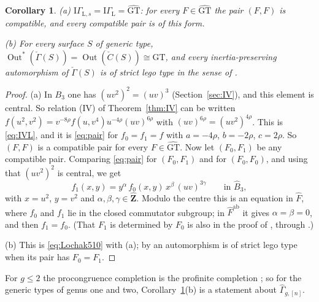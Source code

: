 \documentclass[11pt,a4paper]{article}
\theoremstyle{plain}
\newtheorem{corollary}[theorem]{Corollary}
\theoremstyle{definition}
\theoremstyle{remark}
\newcommand{\GT}{\widehat{\mathrm{GT}}}
\newcommand{\Zh}{\widehat{\mathbf Z}}
\newcommand{\Fh}{\widehat F}
\newcommand{\Bh}{\widehat B}
\newcommand{\Gh}{\widehat\Gamma}
\newcommand{\Out}{\operatorname{Out}}
\newcommand{\ab}{\mathrm{ab}}
\begin{document}
\begin{corollary}\label{cor:Lochak}
\textup{(a)} $\mathrm{I}\Gamma_{\mathrm L,s}=\mathrm{I}\Gamma_{\mathrm L}=\GT$: for every $F\in\GT$ the pair $(F,F)$
is compatible, and every compatible pair is of this form.

\textup{(b)} For every surface $S$ of generic type,
$\Out^*(\check\Gamma(S))=\Out(\check C(S))\cong\GT$, and every inertia-preserving automorphism of
$\check\Gamma(S)$ is of strict lego type in the sense of \cite[Definition 5.8]{Lo}.
\end{corollary}

\begin{proof}
(a) In $B_3$ one has $(uv^2)^2=(uv)^3$ (Section~\ref{sec:IV}), and this element is central. So relation (IV) of
Theorem~\ref{thm:IV} can be written $f(u^2,v^2)=v^{-8\rho}f(u,v^4)u^{-4\rho}(uv)^{6\rho}$ with
$(uv)^{6\rho}=(uv^2)^{4\rho}$. This is \eqref{eq:IVL}, and it is \eqref{eq:pair} for $f_0=f_1=f$ with $a=-4\rho$,
$b=-2\rho$, $c=2\rho$. So $(F,F)$ is a compatible pair for every $F\in\GT$. Now let $(F_0,F_1)$ be any compatible
pair. Comparing \eqref{eq:pair} for $(F_0,F_1)$ and for $(F_0,F_0)$, and using that $(uv^2)^2$ is central, we get
\[
 f_1(x,y)=y^{\alpha}\,f_0(x,y)\,x^{\beta}\,(uv)^{3\gamma}\qquad\text{in }\Bh_3,
\]
with $x=u^2$, $y=v^2$ and $\alpha,\beta,\gamma\in\Zh$. Modulo the centre this is an equation in $\Fh$, where $f_0$
and $f_1$ lie in the closed commutator subgroup; in $\Fh^{\ab}$ it gives $\alpha=\beta=0$, and then $f_1=f_0$.
(That $F_1$ is determined by $F_0$ is also in the proof of \cite[Proposition--Definition 5.6]{Lo}, through
\cite[Proposition 5.5]{Lo}.)

(b) This is \eqref{eq:Lochak510} with (a); by \cite[Definition 5.8]{Lo} an automorphism is of strict lego type
when its pair has $F_0=F_1$.
\end{proof}

For $g\le2$ the procongruence completion is the profinite completion \cite[p.~60]{Lo}; so for the generic types of
genus one and two, Corollary~\ref{cor:Lochak}(b) is a statement about $\Gh_{g,[n]}$.
\end{document}
